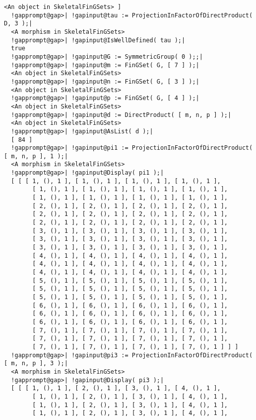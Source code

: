 \documentclass[a4paper,11pt]{report}
\begin{document}
{{{\begin{Verbatim}[commandchars=!@|,fontsize=\small,frame=single,label=Example]
    <An object in SkeletalFinGSets> ]
  !gapprompt@gap>| !gapinput@tau := ProjectionInFactorOfDirectProduct( D, 3 );|
  <A morphism in SkeletalFinGSets>
  !gapprompt@gap>| !gapinput@IsWellDefined( tau );|
  true
  !gapprompt@gap>| !gapinput@G := SymmetricGroup( 0 );;|
  !gapprompt@gap>| !gapinput@m := FinGSet( G, [ 7 ] );|
  <An object in SkeletalFinGSets>
  !gapprompt@gap>| !gapinput@n := FinGSet( G, [ 3 ] );|
  <An object in SkeletalFinGSets>
  !gapprompt@gap>| !gapinput@p := FinGSet( G, [ 4 ] );|
  <An object in SkeletalFinGSets>
  !gapprompt@gap>| !gapinput@d := DirectProduct( [ m, n, p ] );|
  <An object in SkeletalFinGSets>
  !gapprompt@gap>| !gapinput@AsList( d );|
  [ 84 ]
  !gapprompt@gap>| !gapinput@pi1 := ProjectionInFactorOfDirectProduct( [ m, n, p ], 1 );|
  <A morphism in SkeletalFinGSets>
  !gapprompt@gap>| !gapinput@Display( pi1 );|
  [ [ [ 1, (), 1 ], [ 1, (), 1 ], [ 1, (), 1 ], [ 1, (), 1 ], 
        [ 1, (), 1 ], [ 1, (), 1 ], [ 1, (), 1 ], [ 1, (), 1 ], 
        [ 1, (), 1 ], [ 1, (), 1 ], [ 1, (), 1 ], [ 1, (), 1 ], 
        [ 2, (), 1 ], [ 2, (), 1 ], [ 2, (), 1 ], [ 2, (), 1 ], 
        [ 2, (), 1 ], [ 2, (), 1 ], [ 2, (), 1 ], [ 2, (), 1 ], 
        [ 2, (), 1 ], [ 2, (), 1 ], [ 2, (), 1 ], [ 2, (), 1 ], 
        [ 3, (), 1 ], [ 3, (), 1 ], [ 3, (), 1 ], [ 3, (), 1 ], 
        [ 3, (), 1 ], [ 3, (), 1 ], [ 3, (), 1 ], [ 3, (), 1 ], 
        [ 3, (), 1 ], [ 3, (), 1 ], [ 3, (), 1 ], [ 3, (), 1 ], 
        [ 4, (), 1 ], [ 4, (), 1 ], [ 4, (), 1 ], [ 4, (), 1 ], 
        [ 4, (), 1 ], [ 4, (), 1 ], [ 4, (), 1 ], [ 4, (), 1 ], 
        [ 4, (), 1 ], [ 4, (), 1 ], [ 4, (), 1 ], [ 4, (), 1 ], 
        [ 5, (), 1 ], [ 5, (), 1 ], [ 5, (), 1 ], [ 5, (), 1 ], 
        [ 5, (), 1 ], [ 5, (), 1 ], [ 5, (), 1 ], [ 5, (), 1 ], 
        [ 5, (), 1 ], [ 5, (), 1 ], [ 5, (), 1 ], [ 5, (), 1 ], 
        [ 6, (), 1 ], [ 6, (), 1 ], [ 6, (), 1 ], [ 6, (), 1 ], 
        [ 6, (), 1 ], [ 6, (), 1 ], [ 6, (), 1 ], [ 6, (), 1 ], 
        [ 6, (), 1 ], [ 6, (), 1 ], [ 6, (), 1 ], [ 6, (), 1 ], 
        [ 7, (), 1 ], [ 7, (), 1 ], [ 7, (), 1 ], [ 7, (), 1 ], 
        [ 7, (), 1 ], [ 7, (), 1 ], [ 7, (), 1 ], [ 7, (), 1 ], 
        [ 7, (), 1 ], [ 7, (), 1 ], [ 7, (), 1 ], [ 7, (), 1 ] ] ]
  !gapprompt@gap>| !gapinput@pi3 := ProjectionInFactorOfDirectProduct( [ m, n, p ], 3 );|
  <A morphism in SkeletalFinGSets>
  !gapprompt@gap>| !gapinput@Display( pi3 );|
  [ [ [ 1, (), 1 ], [ 2, (), 1 ], [ 3, (), 1 ], [ 4, (), 1 ], 
        [ 1, (), 1 ], [ 2, (), 1 ], [ 3, (), 1 ], [ 4, (), 1 ], 
        [ 1, (), 1 ], [ 2, (), 1 ], [ 3, (), 1 ], [ 4, (), 1 ], 
        [ 1, (), 1 ], [ 2, (), 1 ], [ 3, (), 1 ], [ 4, (), 1 ], 

\end{Verbatim}}}}
\end{document}
